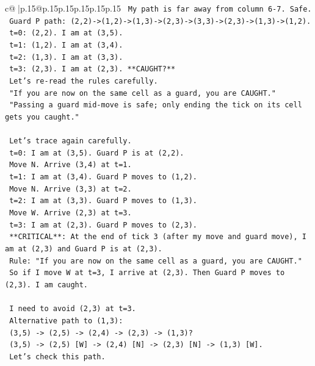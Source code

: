 \documentclass{article}
\begin{document}
{\begin{supertabular}{c@{$\;$}|p{.15\linewidth}@{}p{.15\linewidth}p{.15\linewidth}p{.15\linewidth}p{.15\linewidth}p{.15\linewidth}}
{{{\texttt{   My path is far away from column 6{-}7. Safe.} \\
\texttt{   Guard P path: (2,2){-}>(1,2){-}>(1,3){-}>(2,3){-}>(3,3){-}>(2,3){-}>(1,3){-}>(1,2).} \\
\texttt{   t=0: (2,2). I am at (3,5).} \\
\texttt{   t=1: (1,2). I am at (3,4).} \\
\texttt{   t=2: (1,3). I am at (3,3).} \\
\texttt{   t=3: (2,3). I am at (2,3). **CAUGHT?**} \\
\texttt{   Let's re{-}read the rules carefully.} \\
\texttt{   "If you are now on the same cell as a guard, you are CAUGHT."} \\
\texttt{   "Passing a guard mid{-}move is safe; only ending the tick on its cell gets you caught."} \\
\\ 
\texttt{   Let's trace again carefully.} \\
\texttt{   t=0: I am at (3,5). Guard P is at (2,2).} \\
\texttt{   Move N. Arrive (3,4) at t=1.} \\
\texttt{   t=1: I am at (3,4). Guard P moves to (1,2).} \\
\texttt{   Move N. Arrive (3,3) at t=2.} \\
\texttt{   t=2: I am at (3,3). Guard P moves to (1,3).} \\
\texttt{   Move W. Arrive (2,3) at t=3.} \\
\texttt{   t=3: I am at (2,3). Guard P moves to (2,3).} \\
\texttt{   **CRITICAL**: At the end of tick 3 (after my move and guard move), I am at (2,3) and Guard P is at (2,3).} \\
\texttt{   Rule: "If you are now on the same cell as a guard, you are CAUGHT."} \\
\texttt{   So if I move W at t=3, I arrive at (2,3). Then Guard P moves to (2,3). I am caught.} \\
\\ 
\texttt{   I need to avoid (2,3) at t=3.} \\
\texttt{   Alternative path to (1,3):} \\
\texttt{   (3,5) {-}> (2,5) {-}> (2,4) {-}> (2,3) {-}> (1,3)?} \\
\texttt{   (3,5) {-}> (2,5) {[}W{]} {-}> (2,4) {[}N{]} {-}> (2,3) {[}N{]} {-}> (1,3) {[}W{]}.} \\
\texttt{   Let's check this path.} \\
}}}
\end{supertabular}}
\end{document}
